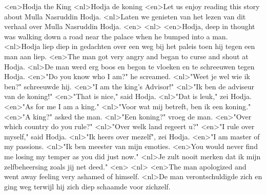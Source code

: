 <en>Hodja the King
<nl>Hodja de koning
<en>Let us enjoy reading this story about Mulla Nasruddin Hodja.
<nl>Laten we genieten van het lezen van dit verhaal over  Mulla Nasruddin Hodja.
<en>
<nl>
<en>Hodja, deep in thought was walking down a road near the palace when he bumped into a man.
<nl>Hodja liep diep in gedachten over een weg bij het paleis toen hij tegen een man aan liep.
<en>The man got very angry and began to curse and shout at Hodja.
<nl>De man werd erg boos en begon te vloeken en te schreeuwen tegen Hodja.
<en>"Do you know who I am?" he screamed.
<nl>"Weet je wel wie ik ben?" schreeuwde hij.
<en>"I am the king's Advisor!"
<nl>"Ik ben de adviseur van de koning!"
<en>"That is nice," said Hodja.
<nl>"Dat is leuk," zei Hodja.
<en>"As for me I am a king."
<nl>"Voor wat mij betreft, ben ik een koning."
<en>"A king?" asked the man.
<nl>"Een koning?" vroeg de man.
<en>"Over which country do you rule?"
<nl>"Over welk land regeert u?"
<en>"I rule over myself," said Hodja.
<nl>"Ik heers over mezelf", zei Hodja.
<en>"I am master of my passions.
<nl>"Ik ben meester van mijn emoties.
<en>You would never find me losing my temper as you did just now."
<nl>Je zult nooit merken dat ik mijn zelfbeheersing zoals jij net deed."
<en>
<nl>
<en>The man apologized and went away feeling very ashamed of himself.
<nl>De man verontschuldigde zich en ging weg terwijl hij zich diep schaamde voor zichzelf.
